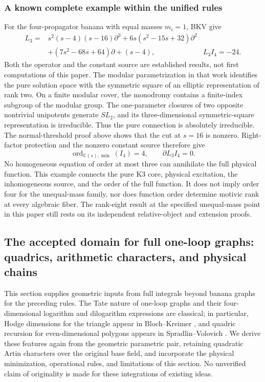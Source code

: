 \documentclass[11pt,a4paper,oneside]{article}
\theoremstyle{plain}
\theoremstyle{definition}
\theoremstyle{remark}
\numberwithin{equation}{section}
\begin{document}
\subsubsection{A known complete example within the unified rules}
For the four-propagator banana with equal masses $m_i=1$, BKV give \cite[Theorem2.2.1]{bkv}
\begin{align*}
 L_3={}&s^2(s-4)(s-16)\partial^3
       +6s(s^2-15s+32)\partial^2\\
      &+(7s^2-68s+64)\partial+(s-4),
 &L_3I_4=-24 .
\end{align*}
Both the operator and the constant source are established results, not first computations of this paper.
The modular parametrization in that work identifies the pure solution space with the symmetric square of an elliptic representation of rank two.
On a finite modular cover, the monodromy contains a finite-index subgroup of the modular group.
The one-parameter closures of two opposite nontrivial unipotents generate $SL_2$,
and its three-dimensional symmetric-square representation is irreducible. Thus the pure connection is absolutely irreducible.
The normal-threshold proof above shows that the cut at $s=16$ is nonzero.
Right-factor protection and the nonzero constant source therefore give
\[
  \operatorname{ord}_{\mathbb C(s),\min}(I_4)=4,
  \qquad \partial L_3 I_4=0 .
\]
No homogeneous equation of order at most three can annihilate the full physical function.
This example connects the pure K3 core, physical excitation, the inhomogeneous source, and the order of the full function.
It does not imply order four for the unequal-mass family, nor does function order determine motivic rank at every algebraic fiber.
The rank-eight result at the specified unequal-mass point in this paper still rests on its independent relative-object and extension proofs.


\subsection{The accepted domain for full one-loop graphs: quadrics, arithmetic characters, and physical chains}
\label{unified:sec:oneloop}
This section supplies geometric inputs from full integrals beyond banana graphs for the preceding rules.
The Tate nature of one-loop graphs and their four-dimensional logarithm and dilogarithm expressions are classical;
in particular, Hodge dimensions for the triangle appear in Bloch--Kreimer \cite[\S7--10]{bkone},
and quadric recursion for even-dimensional polygons appears in Spradlin--Volovich \cite{svone}.
We derive these features again from the geometric parametric pair, retaining quadratic Artin characters over the original base field,
and incorporate the physical minimization, operational rules, and limitations of this section.
No unverified claim of originality is made for these integrations of existing ideas.
\end{document}
